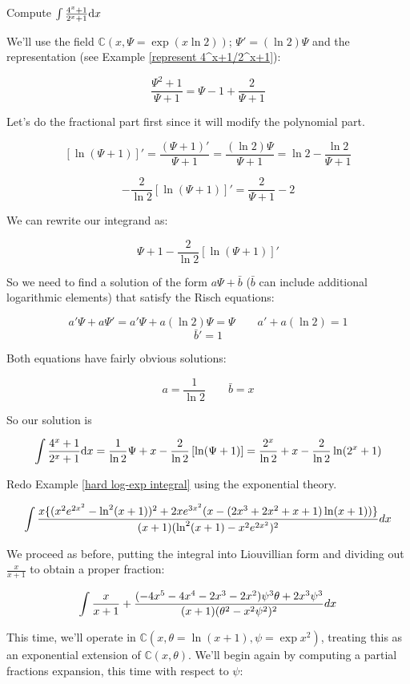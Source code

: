 \example Compute $\int {{4^x+1}\over{2^x+1}} {\rm d}x$
\label{integrate 4^x+1/2^x+1}

We'll use the field ${\mathbb C}(x,\Psi = \exp(x \ln 2))$; $\Psi' =
(\ln 2)\Psi$ and the representation (see Example
\ref{represent 4^x+1/2^x+1}):

$$ \frac{\Psi^2+1}{\Psi+1} = \Psi-1+\frac{2}{\Psi+1}$$

Let's do the fractional part first since it will modify the polynomial
part.

$$\left[\ln(\Psi+1)\right]' = \frac{(\Psi + 1)'}{\Psi+1} = \frac{(\ln
2)\Psi}{\Psi + 1} = \ln 2 - \frac{\ln 2}{\Psi+1}$$

$$-\frac{2}{\ln 2}\left[\ln(\Psi+1)\right]' = \frac{2}{\Psi+1} - 2$$

We can rewrite our integrand as:

$$ \Psi + 1 - \frac{2}{\ln 2}\left[\ln(\Psi+1)\right]'$$

So we need to find a solution of the form $a\Psi + \bar{b}$ ($\bar{b}$
can include additional logarithmic elements) that satisfy the Risch
equations:

$$a'\Psi + a\Psi' = a'\Psi + a(\ln 2)\Psi = \Psi \qquad a' + a(\ln 2) = 1$$
$$\bar{b}' = 1$$

Both equations have fairly obvious solutions:

$$a = \frac{1}{\ln 2} \qquad \bar{b}=x$$

So our solution is

$$\int {{4^x+1}\over{2^x+1}} {\rm d}x = \frac{1}{\ln 2}\Psi + x  - \frac{2}{\ln 2}\left[\ln(\Psi+1)\right] =
\frac{2^x}{\ln 2} + x - \frac{2}{\ln 2}\ln(2^x+1) $$

\endexample

\vfill\eject

\example
Redo Example \ref{hard log-exp integral} using the exponential theory.

$$\int{{x\{(x^2e^{2x^2}-\ln^2(x+1))^2+2xe^{3x^2}(x-(2x^3+2x^2+x+1)\ln(x+1))\}}\over{(x+1)(\ln^2(x+1) - x^2e^{2x^2})^2}} dx$$

We proceed as before, putting the integral into Liouvillian form
and dividing out $\frac{x}{x+1}$ to obtain a proper fraction:

$$\int {x\over{x+1}} + {{(-4x^5-4x^4-2x^3-2x^2)\psi^3\theta + {2x^3}\psi^3}\over{(x+1)(\theta^2 - x^2\psi^2)^2}} dx$$

This time, we'll operate in ${\mathbb C}(x,\theta = \ln (x+1),\psi = \exp x^2)$, treating
this as an exponential extension of ${\mathbb C}(x,\theta)$.  We'll begin again by
computing a partial fractions expansion, this time with respect to $\psi$:

